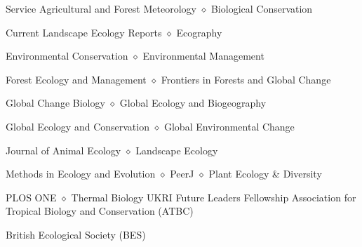 
\begin{rubric}{Service}
	Agricultural and Forest Meteorology $\diamond$ Biological Conservation 
	\par Current Landscape Ecology Reports $\diamond$ Ecography 
	\par Environmental Conservation $\diamond$ Environmental Management 
	\par Forest Ecology and Management  $\diamond$ Frontiers in Forests and Global Change 
	\par Global Change Biology $\diamond$ Global Ecology and Biogeography 
	\par Global Ecology and Conservation $\diamond$ Global Environmental Change 
	\par Journal of Animal Ecology $\diamond$ Landscape Ecology 
	\par Methods in Ecology and Evolution $\diamond$ PeerJ $\diamond$ Plant Ecology \& Diversity 
	\par PLOS ONE $\diamond$ Thermal Biology
	UKRI Future Leaders Fellowship 
	Association for Tropical Biology and Conservation (ATBC) 
	\par British Ecological Society (BES)
\end{rubric}
